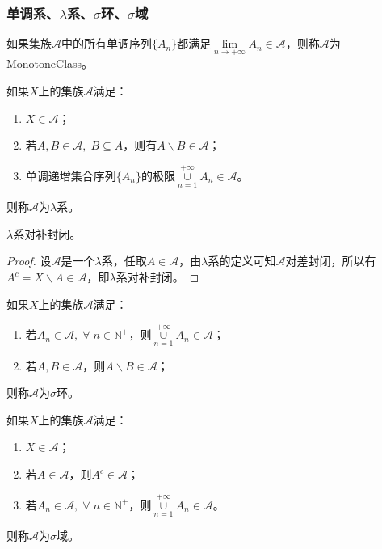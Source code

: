 \subsubsection{单调系、$\lambda$系、$\sigma$环、$\sigma$域}
\begin{definition}
	如果集族$\mathscr{A}$中的所有单调序列$\{A_n\}$都满足$\lim\limits_{n\to+\infty}A_n\in\mathscr{A}$，则称$\mathscr{A}$为\gls{MonotoneClass}。
\end{definition}
\begin{definition}
	如果$X$上的集族$\mathscr{A}$满足：
	\begin{enumerate}
		\item $X\in\mathscr{A}$；
		\item 若$A,B\in\mathscr{A},\;B\subseteq A$，则有$A\backslash B\in\mathscr{A}$；
		\item 单调递增集合序列$\{A_n\}$的极限$\underset{n=1}{\overset{+\infty}{\cup}}A_n\in\mathscr{A}$。
	\end{enumerate}
	则称$\mathscr{A}$为$\lambda$系。
\end{definition}
\begin{property}\label{prop:lambda-System}
	$\lambda$系对补封闭。
\end{property}
\begin{proof}
	设$\mathscr{A}$是一个$\lambda$系，任取$A\in \mathscr{A}$，由$\lambda$系的定义可知$\mathscr{A}$对差封闭，所以有$A^c=X\backslash A\in \mathscr{A}$，即$\lambda$系对补封闭。
\end{proof}
\begin{definition}
	如果$X$上的集族$\mathscr{A}$满足：
	\begin{enumerate}
		\item 若$A_n\in\mathscr{A},\;\forall\;n\in\mathbb{N}^+$，则$\underset{n=1}{\overset{+\infty}{\cup}}A_n\in\mathscr{A}$；
		\item 若$A,B\in\mathscr{A}$，则$A\backslash B\in\mathscr{A}$；
	\end{enumerate}
	则称$\mathscr{A}$为$\sigma$环。
\end{definition}
\begin{definition}
	如果$X$上的集族$\mathscr{A}$满足：
	\begin{enumerate}
		\item $X\in\mathscr{A}$；
		\item 若$A\in\mathscr{A}$，则$A^c\in\mathscr{A}$；
		\item 若$A_n\in\mathscr{A},\;\forall\;n\in\mathbb{N}^+$，则$\underset{n=1}{\overset{+\infty}{\cup}}A_n\in\mathscr{A}$。
	\end{enumerate}
	则称$\mathscr{A}$为$\sigma$域。
\end{definition}
